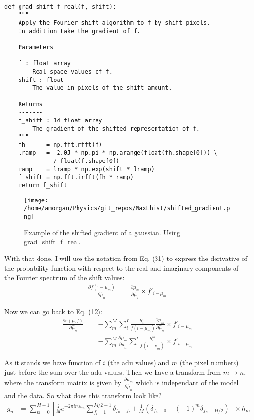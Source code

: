 \documentclass[11pt]{article}
\begin{document}
\begin{verbatim}

def grad_shift_f_real(f, shift):
    """
    Apply the Fourier shift algorithm to f by shift pixels. 
    In addition take the gradient of f.
    
    Parameters
    ----------
    f : float array
        Real space values of f.
    shift : float
        The value in pixels of the shift amount.
            
    Returns
    -------
    f_shift : 1d float array
        The gradient of the shifted representation of f.
    """
    fh      = np.fft.rfft(f)
    lramp   = -2.0J * np.pi * np.arange(float(fh.shape[0])) \
              / float(f.shape[0])
    ramp    = lramp * np.exp(shift * lramp)
    f_shift = np.fft.irfft(fh * ramp)
    return f_shift

\end{verbatim}

\begin{figure}[htp]
\centering
\texttt{[image: /home/amorgan/Physics/git\_repos/MaxLhist/shifted\_gradient.png]}
\caption{Example of the shifted gradient of a gaussian. Using grad\_shift\_f\_real.}
\label{shifted_grad}
\end{figure}


With that done, I will use the notation from Eq. (31) to express the derivative of the probability function with respect to the real and imaginary components of the Fourier spectrum of the shift values:
\begin{align}
   \frac{\partial f(i - \mu_m)}{\partial \hat{\mu}_n} &=  \frac{\partial \mu_m}{\partial \hat{\mu}_n} \times f'_{i-\mu_m}
\end{align}


Now we can go back to Eq. (12):
\begin{align}
   \frac{\partial \varepsilon(\mu, f)}{\partial \hat{\mu}_n} &= -\sum_m^M \sum_i^I \frac{h^m_i}{f(i - \mu_m)} \frac{\partial \mu_m}{\partial \hat{\mu}_n} \times f'_{i-\mu_m} \\
   &= -\sum_m^M  \frac{\partial \mu_m}{\partial \hat{\mu}_n} \sum_i^I \frac{h^m_i}{f(i - \mu_m)} \times f'_{i-\mu_m}
\end{align}


As it stands we have function of $i$ (the adu values) and $m$ (the pixel numbers) just before the sum over the adu values. Then we have a transform from $m\rightarrow n$, where the transform matrix is given by $\frac{\partial \mu_m}{\partial \hat{\mu}_n}$ which is independant of the model and the data. So what does this transform look like?
\begin{align}
   g_n &= \sum_{m=0}^{M-1} \left[ \frac{2}{M} e^{-2\pi i m w_n} \sum_{f_l=1}^{M/2-1} \delta_{f_n - f_l} + \frac{1}{M}\left(\delta_{f_n - 0} +  (-1)^m \delta_{f_n - M/2} \right) \right] \times h_m
\end{align}
\end{document}
